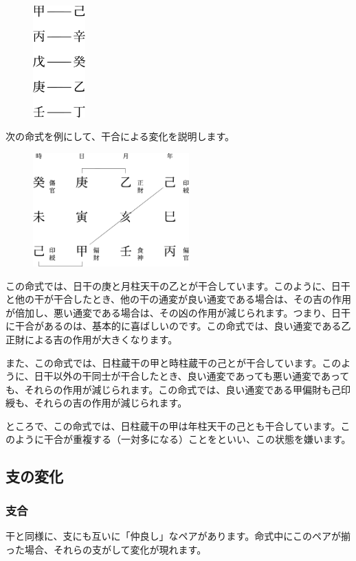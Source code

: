 \documentclass[a5paper,11pt,dvipdfmx]{tarticle}
\begin{document}
\begin{figure}[h]
 \includegraphics[width=20mm,angle=90]{figs/table7-1.eps}
\end{figure}

次の命式を例にして、干合による変化を説明します。

\begin{figure}[h]
  \includegraphics[width=60mm,angle=90]{figs/figure7-1.eps}
\end{figure}

この命式では、日干の庚と月柱天干の乙とが干合しています。このように、日干と他の干が干合したとき、他の干の通変が良い通変である場合は、その吉の作用が倍加し、悪い通変である場合は、その凶の作用が減じられます。つまり、日干に干合があるのは、基本的に喜ばしいのです。この命式では、良い通変である乙正財による吉の作用が大きくなります。

また、この命式では、日柱蔵干の甲と時柱蔵干の己とが干合しています。このように、日干以外の干同士が干合したとき、良い通変であっても悪い通変であっても、それらの作用が減じられます。この命式では、良い通変である甲偏財も己印綬も、それらの吉の作用が減じられます。

ところで、この命式では、日柱蔵干の甲は年柱天干の己とも干合しています。このように干合が重複する（一対多になる）ことをといい、この状態を嫌います。

\subsection{支の変化}

\subsubsection*{支合}
干と同様に、支にも互いに「仲良し」なペアがあります。命式中にこのペアが揃った場合、それらの支がして変化が現れます。
\end{document}
